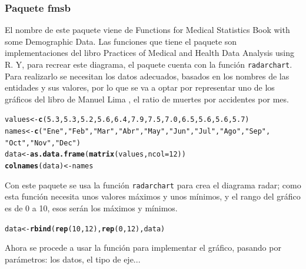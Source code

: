 \documentclass{article}\usepackage[]{graphicx}\usepackage[]{color}
\makeatletter
\newcommand{\hlnum}[1]{\textcolor[rgb]{0.686,0.059,0.569}{#1}}%
\newcommand{\hlstr}[1]{\textcolor[rgb]{0.192,0.494,0.8}{#1}}%
\newcommand{\hlstd}[1]{\textcolor[rgb]{0.345,0.345,0.345}{#1}}%
\newcommand{\hlkwb}[1]{\textcolor[rgb]{0.69,0.353,0.396}{#1}}%
\newcommand{\hlkwc}[1]{\textcolor[rgb]{0.333,0.667,0.333}{#1}}%
\newcommand{\hlkwd}[1]{\textcolor[rgb]{0.737,0.353,0.396}{\textbf{#1}}}%
\newenvironment{kframe}{%
 \def\at@end@of@kframe{}%
 \ifinner\ifhmode%
  \def\at@end@of@kframe{\end{minipage}}%
  \begin{minipage}{\columnwidth}%
 \fi\fi%
 \def\FrameCommand##1{\hskip\@totalleftmargin \hskip-\fboxsep
 \colorbox{shadecolor}{##1}\hskip-\fboxsep
     \hskip-\linewidth \hskip-\@totalleftmargin \hskip\columnwidth}%
 \MakeFramed {\advance\hsize-\width
   \@totalleftmargin\z@ \linewidth\hsize
   \@setminipage}}%
 {\par\unskip\endMakeFramed%
 \at@end@of@kframe}
\newenvironment{knitrout}{}{} %
\makeatother
\begin{document}
\subsubsection{Paquete fmsb}
El nombre de este paquete \cite{docu_fmsb}
viene de Functions for Medical Statistics Book with some Demographic Data. Las funciones que tiene el paquete son implementaciones del libro Practices of Medical and Health Data Analysis using R. Y, para recrear este diagrama, el paquete cuenta con la funci\'on \texttt{radarchart}.
Para realizarlo se necesitan los datos adecuados, basados en los nombres de las entidades y sus valores, por lo que se va a optar por representar uno de los gr\'aficos del libro de Manuel Lima \cite[p\'ag 151]{Circle}, el ratio de muertes por accidentes por mes.
\begin{knitrout}
\color{fgcolor}\begin{kframe}
\begin{alltt}
\hlstd{values} \hlkwb{<-} \hlkwd{c}\hlstd{(}\hlnum{5.3}\hlstd{,} \hlnum{5.3}\hlstd{,} \hlnum{5.2}\hlstd{,} \hlnum{5.6}\hlstd{,} \hlnum{6.4}\hlstd{,} \hlnum{7.9}\hlstd{,} \hlnum{7.5}\hlstd{,} \hlnum{7.0}\hlstd{,} \hlnum{6.5}\hlstd{,} \hlnum{5.6}\hlstd{,} \hlnum{5.6}\hlstd{,} \hlnum{5.7}\hlstd{)}
\hlstd{names} \hlkwb{<-} \hlkwd{c}\hlstd{(}\hlstr{"Ene"}\hlstd{,} \hlstr{"Feb"}\hlstd{,} \hlstr{"Mar"}\hlstd{,} \hlstr{"Abr"}\hlstd{,} \hlstr{"May"}\hlstd{,} \hlstr{"Jun"}\hlstd{,} \hlstr{"Jul"}\hlstd{,} \hlstr{"Ago"}\hlstd{,} \hlstr{"Sep"}\hlstd{,}
           \hlstr{"Oct"}\hlstd{,} \hlstr{"Nov"}\hlstd{,} \hlstr{"Dec"}\hlstd{)}
\hlstd{data} \hlkwb{<-} \hlkwd{as.data.frame}\hlstd{(}\hlkwd{matrix}\hlstd{(values,} \hlkwc{ncol} \hlstd{=} \hlnum{12}\hlstd{))}
\hlkwd{colnames}\hlstd{(data)} \hlkwb{<-} \hlstd{names}
\end{alltt}
\end{kframe}
\end{knitrout}
Con este paquete se usa la funci\'on \texttt{radarchart} para crea el diagrama radar; como esta funci\'on necesita unos valores m\'aximos y unos m\'inimos, y el rango del gr\'afico es de 0 a 10, esos ser\'an los m\'aximos y m\'inimos.
\begin{knitrout}
\color{fgcolor}\begin{kframe}
\begin{alltt}
\hlstd{data} \hlkwb{<-} \hlkwd{rbind}\hlstd{(}\hlkwd{rep}\hlstd{(}\hlnum{10}\hlstd{,}\hlnum{12}\hlstd{),} \hlkwd{rep}\hlstd{(}\hlnum{0}\hlstd{,}\hlnum{12}\hlstd{), data)}
\end{alltt}
\end{kframe}
\end{knitrout}
Ahora se procede a usar la funci\'on para implementar el gr\'afico, pasando por par\'ametros: los datos, el tipo de eje...
\end{document}
